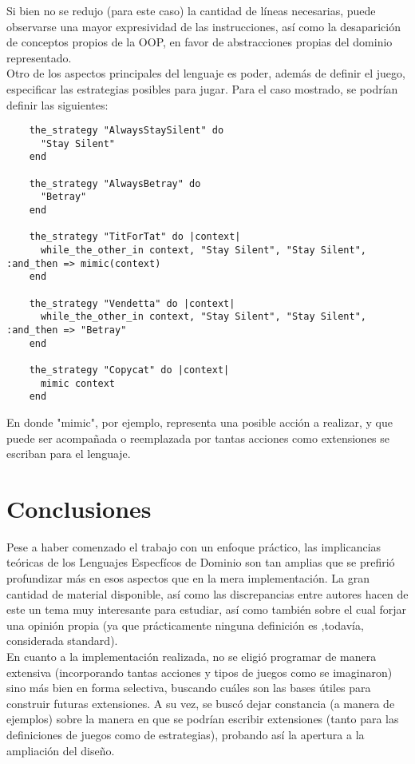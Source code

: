 \documentclass[10pt]{article}
\numberwithin{equation}{section}
\numberwithin{figure}{section}
\numberwithin{table}{section}
\begin{document}
Si bien no se redujo (para este caso) la cantidad de líneas necesarias, puede observarse una mayor expresividad de las instrucciones, así como la desaparición de conceptos propios de la OOP, en favor de abstracciones propias del dominio representado.\\

Otro de los aspectos principales del lenguaje es poder, además de definir el juego, especificar las estrategias posibles para jugar. Para el caso mostrado, se podrían definir las siguientes:
\begin{lstlisting}
    the_strategy "AlwaysStaySilent" do
      "Stay Silent"
    end

    the_strategy "AlwaysBetray" do
      "Betray"
    end

    the_strategy "TitForTat" do |context|
      while_the_other_in context, "Stay Silent", "Stay Silent", :and_then => mimic(context)
    end

    the_strategy "Vendetta" do |context|
      while_the_other_in context, "Stay Silent", "Stay Silent", :and_then => "Betray"
    end

    the_strategy "Copycat" do |context|
      mimic context
    end
\end{lstlisting}

En donde "mimic", por ejemplo, representa una posible acción a realizar, y que puede ser acompañada o reemplazada por tantas acciones como extensiones se escriban para el lenguaje. 
\newpage
\section{Conclusiones}\label{conclusiones}
Pese a haber comenzado el trabajo con un enfoque práctico, las implicancias teóricas de los Lenguajes Especfícos de Dominio son tan amplias que se prefirió profundizar más en esos aspectos que en la mera implementación. La gran cantidad de material disponible, así como las discrepancias entre autores hacen de este un tema muy interesante para estudiar, así como también sobre el cual forjar una opinión propia (ya que prácticamente ninguna definición es ,todavía, considerada standard).\\

En cuanto a la implementación realizada, no se eligió programar de manera extensiva (incorporando tantas acciones y tipos de juegos como se imaginaron) sino más bien en forma selectiva, buscando cuáles son las bases útiles para construir futuras extensiones. A su vez, se buscó dejar constancia (a manera de ejemplos) sobre la manera en que se podrían escribir extensiones (tanto para las definiciones de juegos como de estrategias), probando así la apertura a la ampliación del diseño.\\
\end{document}
